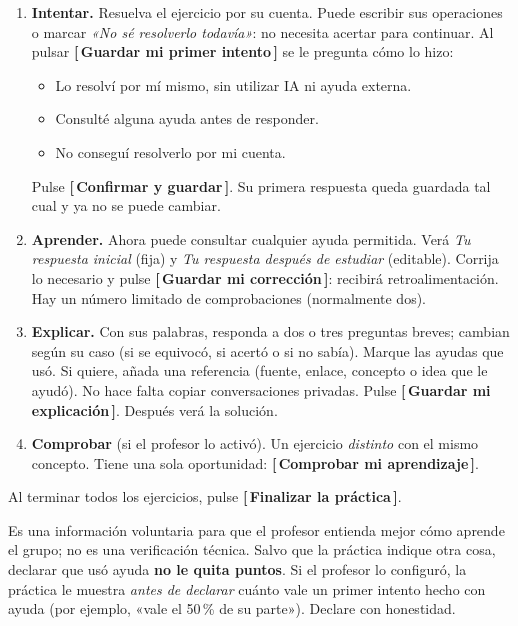 \documentclass[11pt,a4paper,oneside]{book}
\newcommand{\boton}[1]{\textsf{\textbf{[\,#1\,]}}}
\begin{document}
\begin{enumerate}[label=\textbf{\arabic*.}]
  \item \textbf{Intentar.} Resuelva el ejercicio por su cuenta. Puede escribir sus operaciones o marcar
        \emph{«No sé resolverlo todavía»}: no necesita acertar para continuar. Al pulsar
        \boton{Guardar mi primer intento} se le pregunta cómo lo hizo:
        \begin{itemize}
          \item Lo resolví por mí mismo, sin utilizar IA ni ayuda externa.
          \item Consulté alguna ayuda antes de responder.
          \item No conseguí resolverlo por mi cuenta.
        \end{itemize}
        Pulse \boton{Confirmar y guardar}. Su primera respuesta queda guardada tal cual y ya no se puede cambiar.
  \item \textbf{Aprender.} Ahora puede consultar cualquier ayuda permitida. Verá \emph{Tu respuesta inicial} (fija) y
        \emph{Tu respuesta después de estudiar} (editable). Corrija lo necesario y pulse \boton{Guardar mi corrección}:
        recibirá retroalimentación. Hay un número limitado de comprobaciones (normalmente dos).
  \item \textbf{Explicar.} Con sus palabras, responda a dos o tres preguntas breves; cambian según su caso (si se
        equivocó, si acertó o si no sabía). Marque las ayudas que usó. Si quiere, añada una referencia (fuente,
        enlace, concepto o idea que le ayudó). No hace falta copiar conversaciones privadas. Pulse
        \boton{Guardar mi explicación}. Después verá la solución.
  \item \textbf{Comprobar} (si el profesor lo activó). Un ejercicio \emph{distinto} con el mismo concepto. Tiene una
        sola oportunidad: \boton{Comprobar mi aprendizaje}.
\end{enumerate}

Al terminar todos los ejercicios, pulse \boton{Finalizar la práctica}.

\begin{importante}
Es una información voluntaria para que el profesor entienda mejor cómo aprende el grupo; no es una verificación
técnica. Salvo que la práctica indique otra cosa, declarar que usó ayuda \textbf{no le quita puntos}. Si el profesor
lo configuró, la práctica le muestra \emph{antes de declarar} cuánto vale un primer intento hecho con ayuda (por
ejemplo, «vale el 50\,\% de su parte»). Declare con honestidad.
\end{importante}
\end{document}
